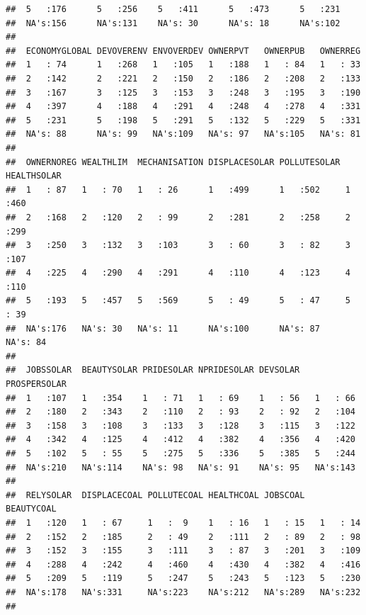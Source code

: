 \documentclass[
]{article}
\begin{document}
\begin{verbatim}
##  5   :176      5   :256    5   :411      5   :473      5   :231    
##  NA's:156      NA's:131    NA's: 30      NA's: 18      NA's:102    
##                                                                    
##  ECONOMYGLOBAL DEVOVERENV ENVOVERDEV OWNERPVT   OWNERPUB   OWNERREG  
##  1   : 74      1   :268   1   :105   1   :188   1   : 84   1   : 33  
##  2   :142      2   :221   2   :150   2   :186   2   :208   2   :133  
##  3   :167      3   :125   3   :153   3   :248   3   :195   3   :190  
##  4   :397      4   :188   4   :291   4   :248   4   :278   4   :331  
##  5   :231      5   :198   5   :291   5   :132   5   :229   5   :331  
##  NA's: 88      NA's: 99   NA's:109   NA's: 97   NA's:105   NA's: 81  
##                                                                      
##  OWNERNOREG WEALTHLIM  MECHANISATION DISPLACESOLAR POLLUTESOLAR HEALTHSOLAR
##  1   : 87   1   : 70   1   : 26      1   :499      1   :502     1   :460   
##  2   :168   2   :120   2   : 99      2   :281      2   :258     2   :299   
##  3   :250   3   :132   3   :103      3   : 60      3   : 82     3   :107   
##  4   :225   4   :290   4   :291      4   :110      4   :123     4   :110   
##  5   :193   5   :457   5   :569      5   : 49      5   : 47     5   : 39   
##  NA's:176   NA's: 30   NA's: 11      NA's:100      NA's: 87     NA's: 84   
##                                                                            
##  JOBSSOLAR  BEAUTYSOLAR PRIDESOLAR NPRIDESOLAR DEVSOLAR   PROSPERSOLAR
##  1   :107   1   :354    1   : 71   1   : 69    1   : 56   1   : 66    
##  2   :180   2   :343    2   :110   2   : 93    2   : 92   2   :104    
##  3   :158   3   :108    3   :133   3   :128    3   :115   3   :122    
##  4   :342   4   :125    4   :412   4   :382    4   :356   4   :420    
##  5   :102   5   : 55    5   :275   5   :336    5   :385   5   :244    
##  NA's:210   NA's:114    NA's: 98   NA's: 91    NA's: 95   NA's:143    
##                                                                       
##  RELYSOLAR  DISPLACECOAL POLLUTECOAL HEALTHCOAL JOBSCOAL   BEAUTYCOAL
##  1   :120   1   : 67     1   :  9    1   : 16   1   : 15   1   : 14  
##  2   :152   2   :185     2   : 49    2   :111   2   : 89   2   : 98  
##  3   :152   3   :155     3   :111    3   : 87   3   :201   3   :109  
##  4   :288   4   :242     4   :460    4   :430   4   :382   4   :416  
##  5   :209   5   :119     5   :247    5   :243   5   :123   5   :230  
##  NA's:178   NA's:331     NA's:223    NA's:212   NA's:289   NA's:232  
##                                                                      

\end{verbatim}
\end{document}
